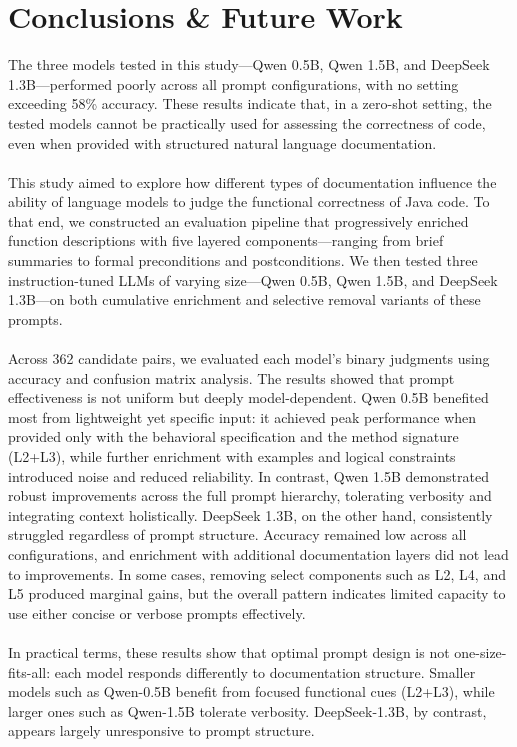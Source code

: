 \documentclass[a4paper]{usiinfbachelorproject}
\begin{document}
\section{Conclusions \& Future Work} \label{sec:concl}
The three models tested in this study—Qwen 0.5B, Qwen 1.5B, and DeepSeek 1.3B—performed poorly across all prompt configurations, with no setting exceeding 58\% accuracy. These results indicate that, in a zero-shot setting, the tested models cannot be practically used for assessing the correctness of code, even when provided with structured natural language documentation.\\
\\
This study aimed to explore how different types of documentation influence the ability of language models to judge the functional correctness of Java code. To that end, we constructed an evaluation pipeline that progressively enriched function descriptions with five layered components—ranging from brief summaries to formal preconditions and postconditions. We then tested three instruction-tuned LLMs of varying size—Qwen 0.5B, Qwen 1.5B, and DeepSeek 1.3B—on both cumulative enrichment and selective removal variants of these prompts. \\
\\
Across 362 candidate pairs, we evaluated each model's binary judgments using accuracy and confusion matrix analysis. The results showed that prompt effectiveness is not uniform but deeply model-dependent. Qwen 0.5B benefited most from lightweight yet specific input: it achieved peak performance when provided only with the behavioral specification and the method signature (L2+L3), while further enrichment with examples and logical constraints introduced noise and reduced reliability. In contrast, Qwen 1.5B demonstrated robust improvements across the full prompt hierarchy, tolerating verbosity and integrating context holistically. DeepSeek 1.3B, on the other hand, consistently struggled regardless of prompt structure. Accuracy remained low across all configurations, and enrichment with additional documentation layers did not lead to improvements. In some cases, removing select components such as L2, L4, and L5 produced marginal gains, but the overall pattern indicates limited capacity to use either concise or verbose prompts effectively. \\
\\
In practical terms, these results show that optimal prompt design is not one-size-fits-all: each model responds differently to documentation structure. Smaller models such as Qwen-0.5B benefit from focused functional cues (L2+L3), while larger ones such as Qwen-1.5B tolerate verbosity. DeepSeek-1.3B, by contrast, appears largely unresponsive to prompt structure.
\end{document}
